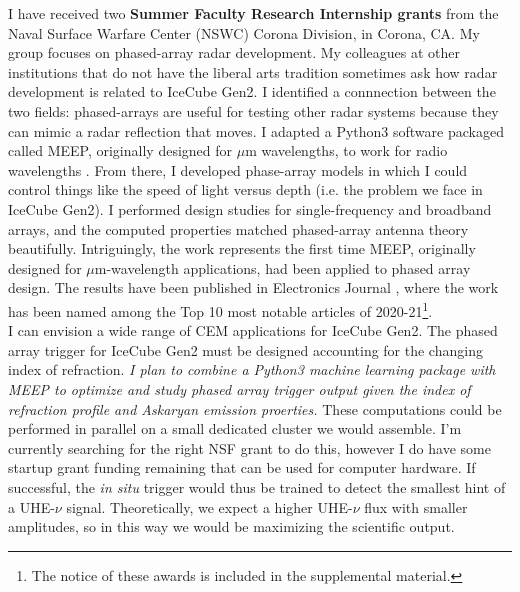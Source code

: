 \documentclass[../../../main.tex]{subfiles}
\begin{document}
I have received two \textbf{Summer Faculty Research Internship grants} from the Naval Surface Warfare Center (NSWC) Corona Division, in Corona, CA.  My group focuses on phased-array radar development.  My colleagues at other institutions that do not have the liberal arts tradition sometimes ask how radar development is related to IceCube Gen2.  I identified a connnection between the two fields: phased-arrays are useful for testing other radar systems because they can mimic a radar reflection that moves.  I adapted a Python3 software packaged called MEEP, originally designed for $\mu$m wavelengths, to work for radio wavelengths \cite{10.1016/j.cpc.2009.11.008}.  From there, I developed phase-array models in which I could control things like the speed of light versus depth (i.e. the problem we face in IceCube Gen2).  I performed design studies for single-frequency and broadband arrays, and the computed properties matched phased-array antenna theory beautifully.  Intriguingly, the work represents the first time MEEP, originally designed for $\mu$m-wavelength applications, had been applied to phased array design.  The results have been published in Electronics Journal \cite{electronics10040415}, where the work has been named among the Top 10 most notable articles of 2020-21\footnote{The notice of these awards is included in the supplemental material.}.
\\
\vspace{0.25cm}
I can envision a wide range of CEM applications for IceCube Gen2.  The phased array trigger for IceCube Gen2 must be designed accounting for the changing index of refraction.  \textit{I plan to combine a Python3 machine learning package with MEEP to optimize and study phased array trigger output given the index of refraction profile and Askaryan emission proerties.}  These computations could be performed in parallel on a small dedicated cluster we would assemble.  I'm currently searching for the right NSF grant to do this, however I do have some startup grant funding remaining that can be used for computer hardware.  If successful, the \textit{in situ} trigger would thus be trained to detect the smallest hint of a UHE-$\nu$ signal.  Theoretically, we expect a higher UHE-$\nu$ flux with smaller amplitudes, so in this way we would be maximizing the scientific output.
\\
\vspace{0.25cm}
\end{document}

